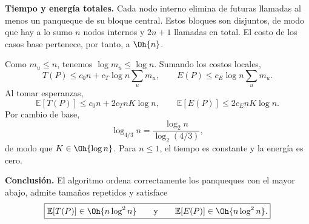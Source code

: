 \textbf{Tiempo y energía totales.} Cada nodo interno elimina de futuras llamadas al menos un panqueque de su bloque central. Estos bloques son disjuntos, de modo que hay a lo sumo $n$ nodos internos y $2n+1$ llamadas en total. El costo de los casos base pertenece, por tanto, a $\Oh{n}$.

Como $m_u\le n$, tenemos $\log m_u\le\log n$. Sumando los costos locales,
\[
T(P)\le c_0n+c_T\log n\sum_u m_u,\qquad
E(P)\le c_E\log n\sum_u m_u.
\]
Al tomar esperanzas,
\[
\mathbb E[T(P)]\le c_0n+2c_TnK\log n,\qquad
\mathbb E[E(P)]\le2c_EnK\log n.
\]
Por cambio de base,
\[
\log_{4/3}n=\frac{\log_2n}{\log_2(4/3)},
\]
de modo que $K\in\Oh{\log n}$. Para $n\le1$, el tiempo es constante y la energía es cero.

\textbf{Conclusión.} El algoritmo ordena correctamente los panqueques con el mayor abajo, admite tamaños repetidos y satisface
\[
\boxed{\mathbb E[T(P)]\in\Oh{n\log^2 n}
\qquad\text{y}\qquad
\mathbb E[E(P)]\in\Oh{n\log^2 n}.}
\]
\fin
